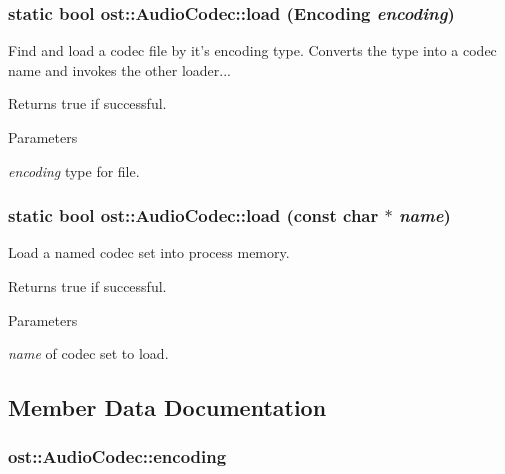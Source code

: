 \subsubsection[{load}]{\setlength{\rightskip}{0pt plus 5cm}static bool ost::AudioCodec::load ({\bf Encoding} {\em encoding})\hspace{0.3cm}{\ttfamily  [static]}}\label{classost_1_1_audio_codec_a15af308cffe36ef275772c9047b3b2b5}


Find and load a codec file by it's encoding type. Converts the type into a codec name and invokes the other loader...

\begin{DoxyReturn}{Returns}
true if successful. 
\end{DoxyReturn}

\begin{DoxyParams}{Parameters}
\item[{\em encoding}]type for file. \end{DoxyParams}
\subsubsection[{load}]{\setlength{\rightskip}{0pt plus 5cm}static bool ost::AudioCodec::load (const char $\ast$ {\em name})\hspace{0.3cm}{\ttfamily  [static]}}\label{classost_1_1_audio_codec_a7f2483c2267044701fdcca3549f4e8c8}


Load a named codec set into process memory. \begin{DoxyReturn}{Returns}
true if successful. 
\end{DoxyReturn}

\begin{DoxyParams}{Parameters}
\item[{\em name}]of codec set to load. \end{DoxyParams}


\subsection{Member Data Documentation}
\subsubsection[{encoding}]{ {\bf ost::AudioCodec::encoding}\hspace{0.3cm}{\ttfamily  [protected]}}\label{classost_1_1_audio_codec_a7c5e345679761e0b6c9958005af5e173}
